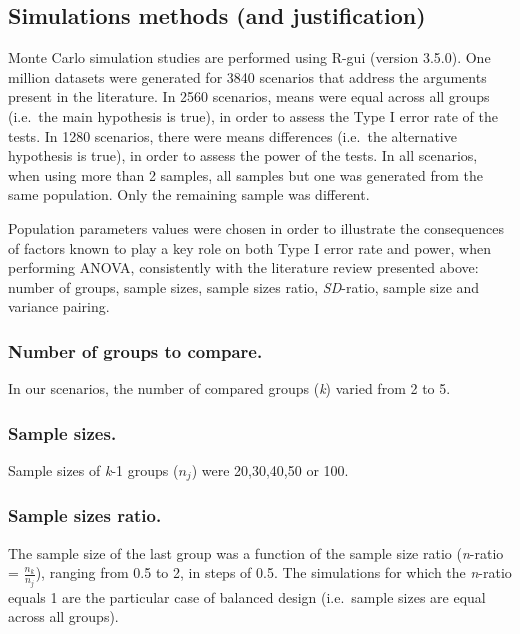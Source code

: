 \documentclass[man,floatsintext]{apa6}
\begin{document}
\subsection{Simulations methods (and
justification)}\label{simulations-methods-and-justification}

Monte Carlo simulation studies are performed using R-gui (version
3.5.0). One million datasets were generated for 3840 scenarios that
address the arguments present in the literature. In 2560 scenarios,
means were equal across all groups (i.e.~the main hypothesis is true),
in order to assess the Type I error rate of the tests. In 1280
scenarios, there were means differences (i.e.~the alternative hypothesis
is true), in order to assess the power of the tests. In all scenarios,
when using more than 2 samples, all samples but one was generated from
the same population. Only the remaining sample was different.

Population parameters values were chosen in order to illustrate the
consequences of factors known to play a key role on both Type I error
rate and power, when performing ANOVA, consistently with the literature
review presented above: number of groups, sample sizes, sample sizes
ratio, \emph{SD}-ratio, sample size and variance pairing.

\subsubsection{Number of groups to
compare.}\label{number-of-groups-to-compare.}

In our scenarios, the number of compared groups (\emph{k}) varied from 2
to 5.

\subsubsection{Sample sizes.}\label{sample-sizes.}

Sample sizes of \emph{k}-1 groups (\(n_j\)) were 20,30,40,50 or 100.

\subsubsection{Sample sizes ratio.}\label{sample-sizes-ratio.}

The sample size of the last group was a function of the sample size
ratio (\emph{n}-ratio = \(\frac{n_k}{n_j}\)), ranging from 0.5 to 2, in
steps of 0.5. The simulations for which the \emph{n}-ratio equals 1 are
the particular case of balanced design (i.e.~sample sizes are equal
across all groups).
\end{document}
